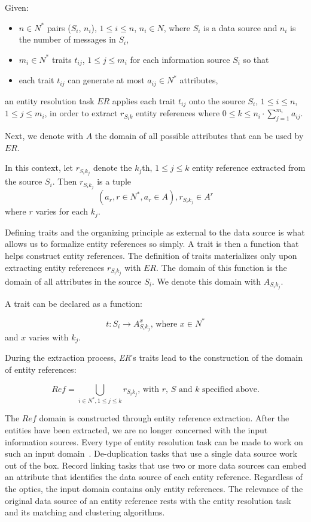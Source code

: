 \documentclass[journal]{IEEEtran}
\begin{document}
    Given:
    \begin{itemize}
        \item $n \in N^*$ pairs ($S_i$, $n_i$), $1 \leq i \leq n$, $n_i \in N$, 
        where $S_i$ is a data source and $n_i$ is the number of messages in
        $S_i$,
        \item $m_i \in N^*$ traits $t_{ij}$, $1 \leq j \leq m_i$ for each
        information source $S_i$ so that
        \item each trait $t_{ij}$ can generate at most $a_{ij} \in N^*$
        attributes,
    \end{itemize}
    an entity resolution task $ER$ applies each trait $t_{ij}$ onto the source
    $S_i$, $1 \leq i \leq n$, $1 \leq j \leq m_i$, in order to extract
    $r_{{S_i}k}$ entity references where
    $0 \leq k \leq n_i \cdot \sum^{m_i}_{j=1}a_{ij}$.
    
    Next, we denote with $A$ the domain of all possible attributes that can be
    used by $ER$.

    In this context, let $r_{{S_i}{k_j}}$ denote the $k_j$th, $1 \leq j \leq k$
    entity reference extracted from the source $S_i$.
    Then $r_{{S_i}{k_j}}$ is a tuple
    \[
        (a_r, r \in N^*, a_r \in A), r_{{S_i}{k_j}} \in A^r
    \]
    where $r$ varies for each $k_j$.

    Defining traits and the organizing principle as external to the data source
    is what allows us to formalize entity references so simply.
    A trait is then a function that helps construct entity references.
    The definition of traits materializes only upon extracting entity references
    $r_{{S_i}{k_j}}$ with $ER$.
    The domain of this function is the domain of all attributes in the source
    $S_i$.
    We denote this domain with $A_{{S_i}{k_j}}$.
    
    A trait can be declared as a function:

    \[
        t: S_i \rightarrow A_{{S_i}{k_j}}^x\textrm{, where }x \in N^*
    \]
    and $x$ varies with $k_j$.

    During the extraction process, \textit{ER}'s traits lead to the construction
    of the domain of entity references:

    \[
        Ref = \bigcup_{i \in N^*,1 \leq j \leq k} r_{{S_i}{k_j}}
        \textrm{, with } r \textrm{, }S \textrm{ and } k \textrm{ specified above.}
    \]

    The $Ref$ domain is constructed through entity reference extraction.
    After the entities have been extracted, we are no longer concerned with the
    input information sources.
    Every type of entity resolution task can be made to work on such an input
    domain~\cite{Pap19}.
    De-duplication tasks that use a single data source work out of the box.
    Record linking tasks that use two or more data sources can embed an
    attribute that identifies the data source of each entity reference.
    Regardless of the optics, the input domain contains only entity references.
    The relevance of the original data source of an entity reference rests with
    the entity resolution task and its matching and clustering algorithms.
\end{document}
